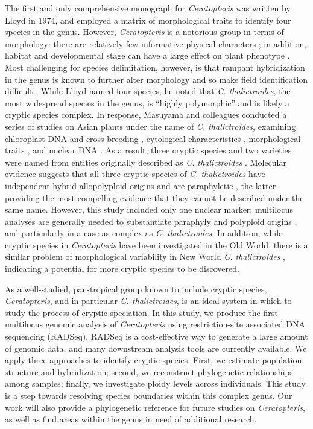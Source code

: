 \documentclass[12pt]{article}
\begin{document}
\begin{flushleft}
The first and only comprehensive monograph for \textit{Ceratopteris} was written by Lloyd in 1974, and employed a matrix of morphological traits to identify four species in the genus\nocite{LloydTax1974}. However, \textit{Ceratopteris} is a notorious group in terms of morphology: there are relatively few informative physical characters \autocite{LloydTax1974}; in addition, habitat and developmental stage can have a large effect on plant phenotype \autocite{Masuyama1992}. Most challenging for species delimitation, however, is that rampant hybridization in the genus is known to further alter morphology and so make field identification difficult \autocite{hickok1974, LloydTax1974, Masuyama2010}. While Lloyd named four species, he noted that \textit{C. thalictroides}, the most widespread species in the genus, is ``highly polymorphic'' \autocite{LloydTax1974} and is likely a cryptic species complex. In response, Masuyama and colleagues conducted a series of studies on Asian plants under the name of \textit{C. thalictroides}, examining chloroplast DNA and cross-breeding \autocite{Masuyama2002}, cytological characteristics \autocite{Masuyama2005}, morphological traits \autocite{Masuyama1992, Masuyama2008}, and nuclear DNA \autocite{Adjie2007}. As a result, three cryptic species and two varieties were named from entities originally described as \textit{C. thalictroides} \autocite{Masuyama2010}. Molecular evidence suggests that all three cryptic species of \textit{C. thalictroides} have independent hybrid allopolyploid origins and are paraphyletic \autocite{Adjie2007}, the latter providing the most compelling evidence that they cannot be described under the same name. However, this study included only one nuclear marker; multilocus analyses are generally needed to substantiate paraphyly and polyploid origins \autocite{Eaton2013, Jorgensen2017}, and particularly in a case as complex as \textit{C. thalictroides}. In addition, while cryptic species in \textit{Ceratopteris} have been investigated in the Old World, there is a similar problem of morphological variability in New World \textit{C. thalictroides} \autocite{Masuyama2010, LloydTax1974}, indicating a potential for more cryptic species to be discovered.

As a well-studied, pan-tropical group known to include cryptic species, \textit{Ceratopteris}, and in particular \textit{C. thalictroides}, is an ideal system in which to study the process of cryptic speciation. In this study, we produce the first multilocus genomic analysis of \textit{Ceratopteris} using restriction-site associated DNA sequencing (RADSeq). RADSeq is a cost-effective way to generate a large amount of genomic data, and many downstream analysis tools are currently available. We apply three approaches to identify cryptic species. First, we estimate population structure and hybridization; second, we reconstruct phylogenetic relationships among samples; finally, we investigate ploidy levels across individuals. This study is a step towards resolving species boundaries within this complex genus. Our work will also provide a phylogenetic reference for future studies on \textit{Ceratopteris}, as well as find areas within the genus in need of additional research.


\end{flushleft}
\end{document}
